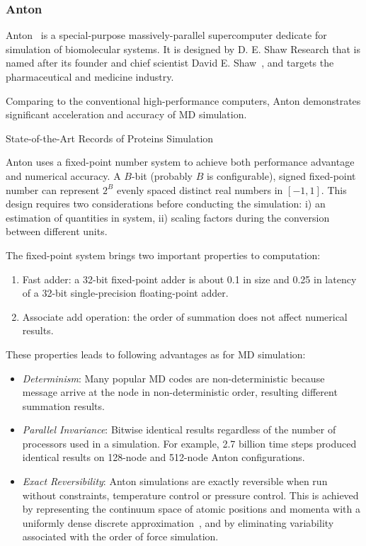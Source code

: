 \documentclass[a4paper,10pt,technote,compsoc,onecolumn]{IEEEtran}
\numberwithin{equation}{section}
\begin{document}
\subsubsection{Anton}
Anton~\cite{shaw08acm} is a special-purpose massively-parallel supercomputer
dedicate for simulation of biomolecular systems. It is designed by D. E. Shaw
Research that is named after its founder and chief scientist David E.
Shaw~\cite{desres}, and targets the pharmaceutical and medicine industry.

Comparing to the conventional high-performance computers, Anton demonstrates
significant acceleration and accuracy of \ac{MD} simulation.

\begin{table}[htp]
\caption{State-of-the-Art Records of Proteins Simulation}
\label{tab:anton_records}
\centering

\end{table}


Anton uses a fixed-point number system to achieve both performance advantage
and numerical accuracy. A $B$-bit (probably $B$ is configurable), signed
fixed-point number can represent $2^B$ evenly spaced distinct real numbers in
$[-1,1]$. This design requires two considerations before conducting the
simulation: i) an estimation of quantities in system, ii) scaling factors
during the conversion between different units.

The fixed-point system brings two important properties to computation:
\begin{enumerate}
  \item Fast adder: a 32-bit fixed-point adder is about 0.1 in size and
  0.25 in latency of a 32-bit single-precision floating-point adder.

  \item Associate add operation: the order of summation does not affect
  numerical results.
\end{enumerate}
These properties leads to following advantages as for \ac{MD} simulation:
\begin{itemize}
  \item {\em Determinism}: Many popular \ac{MD} codes are non-deterministic
  because message arrive at the node in non-deterministic order, resulting
  different summation results.

  \item {\em Parallel Invariance}: Bitwise identical results regardless of the
  number of processors used in a simulation. For example, 2.7 billion time
  steps produced identical results on 128-node and 512-node Anton
  configurations.

  \item {\em Exact Reversibility}: Anton simulations are exactly reversible
  when run without constraints, temperature control or pressure control. This
  is achieved by representing the continuum space of atomic positions and
  momenta with a uniformly dense discrete approximation~\cite{bowers06sc,
  skeel99sif}, and by eliminating variability associated with the order of
  force simulation.
\end{itemize}
\end{document}
